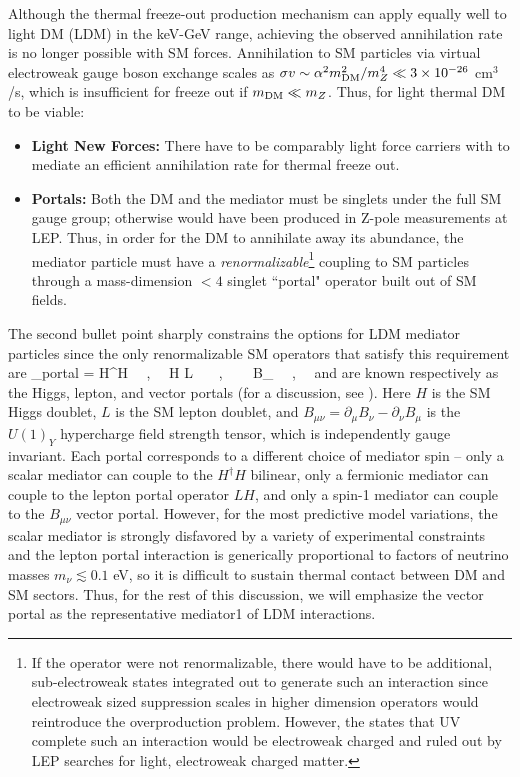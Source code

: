 \documentclass{article}
\begin{document}
Although the thermal freeze-out production mechanism can apply equally well to light DM (LDM) in the keV-GeV range, 
achieving the observed annihilation rate is no longer possible with SM forces. Annihilation to SM particles via virtual electroweak gauge boson exchange
scales as $\sigma v \sim \alpha^2 m_{\rm DM}^2/m_Z^4 \ll 3\times 10^{-26} $ cm$^3$/s, which is insufficient for freeze out if $m_{\rm DM} \ll m_{Z}$. Thus,
for light thermal DM to be viable:
\begin{itemize}
\item {\bf Light New Forces:} There have to be comparably light force carriers with to mediate an efficient  annihilation rate 
for thermal freeze out. 
\item {\bf Portals: } Both the DM and the mediator must be singlets under the full SM gauge group; otherwise 
 would have been produced in Z-pole measurements at LEP. Thus, in order for the DM to annihilate away its abundance, the mediator particle 
 must have a {\it renormalizable}\footnote{If the operator were not renormalizable, 
 there would have to be additional, sub-electroweak states integrated out to generate 
 such an interaction since electroweak sized suppression scales in higher dimension operators would reintroduce 
 the overproduction problem. However, the states that UV complete such an interaction would be 
 electroweak charged and ruled out by LEP searches for light, electroweak charged matter. } coupling to SM particles through a mass-dimension $< 4$ singlet ``portal" operator built out of SM fields.
\end{itemize}
The second bullet point sharply constrains the options for LDM mediator particles since the only renormalizable SM operators that
satisfy this requirement are 
\be
{}_{\rm portal}   =  H^\dagger H  ~~,~~   H L ~~~, ~~~ B_{\mu\nu} ~~,~~
\ee
and are known respectively as the Higgs, lepton, and vector portals (for a discussion, see \cite{Pospelov:2008zw}). Here $H$ is the SM Higgs doublet, $L$ is the SM lepton doublet, and 
$B_{\mu \nu } = \partial_\mu B_\nu - \partial_\nu B_\mu$ is the $U(1)_Y$ hypercharge field strength tensor, which is independently gauge invariant. 
Each portal corresponds to a different choice of mediator spin -- only a scalar mediator can couple to the $H^\dagger H$ bilinear, only a fermionic mediator can couple to 
the lepton portal operator $LH$, and only a spin-1 mediator can couple to the $B_{\mu \nu}$ vector portal.
However, for the most predictive model variations, the scalar mediator is strongly disfavored by a variety of experimental constraints \cite{Krnjaic:2015mbs} 
and the lepton portal interaction is generically proportional to factors of neutrino masses $m_\nu \lesssim 0.1$ eV, so it is difficult to sustain 
thermal contact between DM and SM sectors. Thus, for the rest of this discussion, we will emphasize the vector portal as the representative mediator1
of LDM interactions. 
\end{document}
